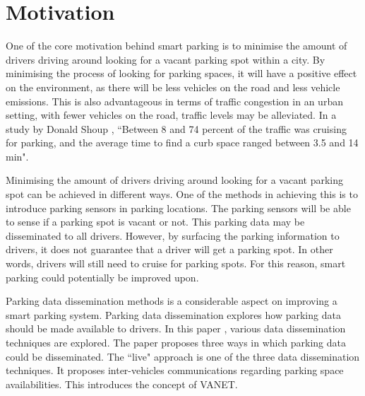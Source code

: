 \section{Motivation}
One of the core motivation behind smart parking is to minimise the amount of drivers driving around looking for a vacant parking spot within a city. By minimising the process of looking for parking spaces, it will have a positive effect on the environment, as there will be less vehicles on the road and less vehicle emissions. This is also advantageous in terms of traffic congestion in an urban setting, with fewer vehicles on the road, traffic levels may be alleviated. In a study by Donald Shoup \citep{Shoup2006CruisingParking}, ``Between 8 and 74 percent of the traffic was cruising for parking, and the average time to find a curb space ranged between 3.5 and 14 min".

Minimising the amount of drivers driving around looking for a vacant parking spot can be achieved in different ways. One of the methods in achieving this is to introduce parking sensors in parking locations. The parking sensors will be able to sense if a parking spot is vacant or not. This parking data may be disseminated to all drivers. However, by surfacing the parking information to drivers, it does not guarantee that a driver will get a parking spot. In other words, drivers will still need to cruise for parking spots. For this reason, smart parking could potentially be improved upon.

Parking data dissemination methods is a considerable aspect on improving a smart parking system. Parking data dissemination explores how parking data should be made available to drivers. In this paper \citep{Verroios2011ReachingNetworking}, various data dissemination techniques are explored. The paper proposes three ways in which parking data could be disseminated. The ``live" approach is one of the three data dissemination techniques. It proposes inter-vehicles communications regarding parking space availabilities. This introduces the concept of \ac{VANET}.

